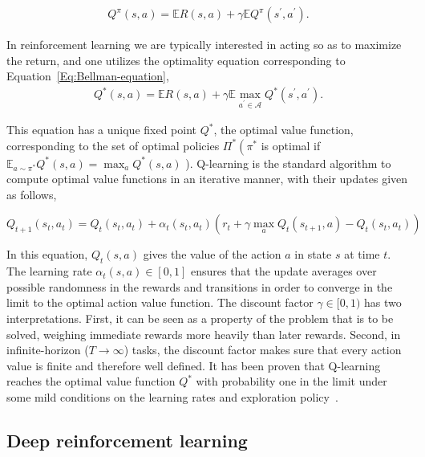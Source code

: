 \documentclass[10pt]{article}
\begin{document}
\begin{align}\label{Eq:Bellman-equation}
Q^{\pi}(s, a)=\mathbb{E} R(s, a)+\gamma {\mathbb{E}} Q^{\pi}\left(s^{\prime}, a^{\prime}\right) .
\end{align}


In reinforcement learning we are typically interested in acting so as to maximize the return, and one utilizes the optimality equation corresponding to Equation~\ref{Eq:Bellman-equation},
\begin{align}\label{Eq:Bellman-optimality}
Q^{*}(s, a)=\mathbb{E} R(s, a)+\gamma \mathbb{E} \max _{a^{\prime} \in \mathcal{A}} Q^{*}\left(s^{\prime}, a^{\prime}\right) .
\end{align}

This equation has a unique fixed point $Q^{*}$, the optimal value function, corresponding to the set of optimal policies $\Pi^{*}\left(\pi^{*}\right.$ is optimal if $\mathbb{E}_{a \sim \pi^{*}} Q^{*}(s, a)=\max _{a} Q^{*}(s, a)$ ). Q-learning is the standard algorithm to compute optimal value functions in an iterative manner, with their updates given as follows,



\begin{equation}\label{Eq:Q-learning}
Q_{t+1}\left(s_{t}, a_{t}\right)=Q_{t}\left(s_{t}, a_{t}\right)+\alpha_{t}\left(s_{t}, a_{t}\right)\left(r_{t}+\gamma \max _{a} Q_{t}\left(s_{t+1}, a\right)-Q_{t}\left(s_{t}, a_{t}\right)\right) 
\end{equation}

In this equation, $Q_{t}(s, a)$ gives the value of the action $a$ in state $s$ at time $t$. The learning rate $\alpha_{t}(s, a) \in[0,1]$ ensures that the update averages over possible randomness in the rewards and transitions in order to converge in the limit to the optimal action value function. The discount factor $\gamma \in[0,1)$ has two interpretations. First, it can be seen as a property of the problem that is to be solved, weighing immediate rewards more heavily than later rewards. Second, in infinite-horizon ($T \to \infty$)  tasks, the discount factor makes sure that every action value is finite and therefore well defined. It has been proven that Q-learning reaches the optimal value function $Q^{*}$ with probability one in the limit under some mild conditions on the learning rates and exploration policy~\citep{puterman1990markov}. 

\subsection{Deep reinforcement learning}
\end{document}
